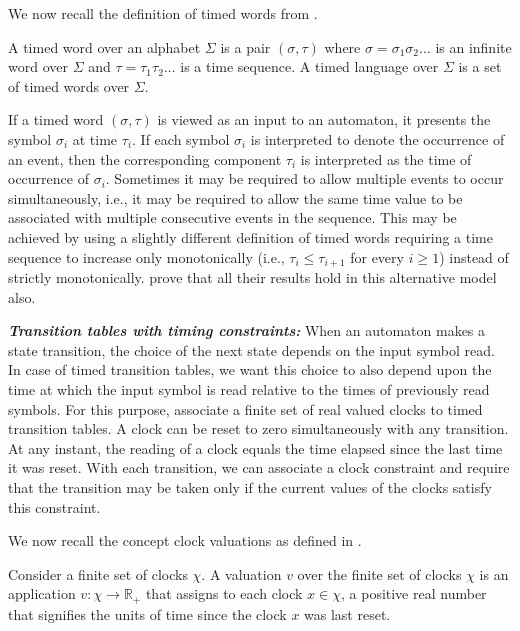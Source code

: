 We now recall the definition of timed words from \cite{1}.

\begin{definition}
A timed word over an alphabet $\Sigma$ is a pair $(\sigma, \tau)$ where $\sigma = \sigma_{1}\sigma_{2}\ldots$ is an infinite word over $\Sigma$ and $\tau = \tau_{1}\tau_{2}\ldots$ is a time sequence. A timed language over $\Sigma$ is a set of timed words over $\Sigma$.
\end{definition}

If a timed word $(\sigma, \tau)$ is viewed as an input to an automaton, it presents the symbol $\sigma_{i}$ at time $\tau_{i}$. If each symbol $\sigma_{i}$ is interpreted to denote the occurrence of an event, then the corresponding component $\tau_{i}$ is interpreted as the time of occurrence of $\sigma_{i}$. Sometimes it may be required to allow multiple events to occur simultaneously, i.e., it may be required to allow the same time value to be associated with multiple consecutive events in the sequence. This may be achieved by using a slightly different definition of timed words requiring a time sequence to increase only monotonically (i.e., $\tau_{i} \leq \tau_{i+1}$ for every $i \geq 1$) instead of strictly monotonically. \citet{1} prove that all their results hold in this alternative model also.

\textit{\textbf{Transition tables with timing constraints:}} When an automaton makes a state transition, the choice of the next state depends on the input symbol read. In case of timed transition tables, we want this choice to also depend upon the time at which the input symbol is read relative to the times of previously read symbols. For this purpose, \citet{1} associate a finite set of real valued clocks to timed transition tables. A clock can be reset to zero simultaneously with any transition. At any instant, the reading of a clock equals the time elapsed since the last time it was reset. With each transition, we can associate a clock constraint and require that the transition may be taken only if the current values of the clocks satisfy this constraint.

We now recall the concept clock valuations as defined in \cite{1,BBM-concur10,BBM-report}.

\begin{definition}
Consider a finite set of clocks $\chi$. A valuation $v$ over the finite set of clocks $\chi$ is an application $v: \chi \rightarrow \mathbb{R}_{+}$ that assigns to each clock $x \in \chi$, a positive real number that signifies the units of time since the clock $x$ was last reset.
\end{definition}

